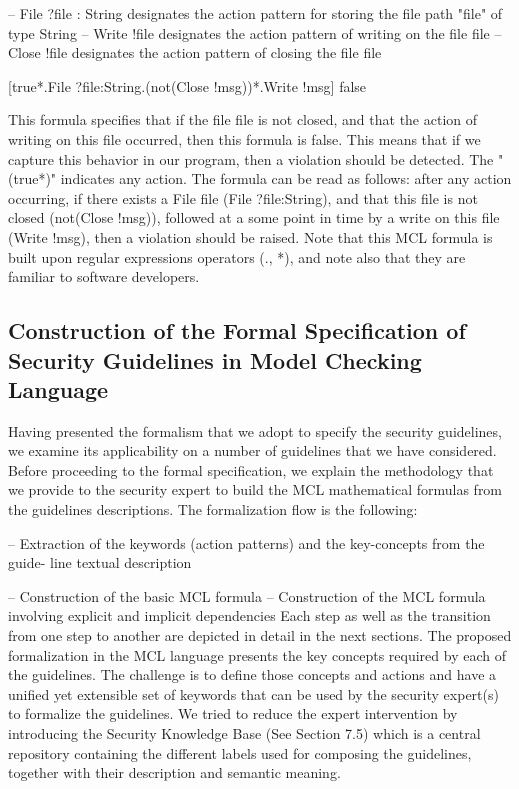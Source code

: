 \documentclass[10pt]{article}
\begin{document}
– {File ?file : String} designates the action pattern for storing the file path "file"
of type String
– {Write !file} designates the action pattern of writing on the file file
– {Close !file} designates the action pattern of closing the file file

[true*.{File ?file:String}.(not({Close !msg}))*.{Write !msg}] false

This formula specifies that if the file file is not closed, and that the action of writing on
this file occurred, then this formula is false. This means that if we capture this behavior
in our program, then a violation should be detected. The "(true*)" indicates any action.
The formula can be read as follows: after any action occurring, if there exists a File file
(File ?file:String), and that this file is not closed (not(Close !msg)), followed at a some
point in time by a write on this file (Write !msg), then a violation should be raised.
Note that this MCL formula is built upon regular expressions operators (., *), and note
also that they are familiar to software developers.

\subsection{Construction of the Formal Specification of Security
Guidelines in Model Checking Language}
Having presented the formalism that we adopt to specify the security guidelines, we
examine its applicability on a number of guidelines that we have considered. Before
proceeding to the formal specification, we explain the methodology that we provide
to the security expert to build the MCL mathematical formulas from the guidelines
descriptions.
The formalization flow is the following:

– Extraction of the keywords (action patterns) and the key-concepts from the guide-
line textual description

– Construction of the basic MCL formula
– Construction of the MCL formula involving explicit and implicit dependencies
Each step as well as the transition from one step to another are depicted in detail in
the next sections.
The proposed formalization in the MCL language presents the key concepts required by
each of the guidelines. The challenge is to define those concepts and actions and have
a unified yet extensible set of keywords that can be used by the security expert(s) to
formalize the guidelines. We tried to reduce the expert intervention by introducing the
Security Knowledge Base (See Section 7.5) which is a central repository containing the
different labels used for composing the guidelines, together with their description and
semantic meaning.
\end{document}
